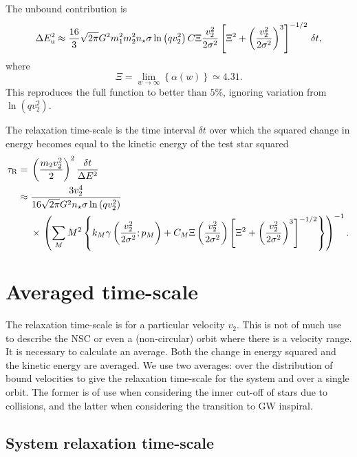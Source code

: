 The unbound contribution is
\begin{equation}
\Delta E_\mathrm{u}^2 \approx \dfrac{16}{3}\sqrt{2\pi}G^2m_1^2m_2^2n_\star\sigma\ln\left(qv_2^2\right) C \Xi \dfrac{v_2^2}{2\sigma^2} \left[\Xi^2 + \left(\dfrac{v_2^2}{2\sigma^2}\right)^3\right]^{-1/2}\,\delta t,
\label{eq:Unbound-approx}
\end{equation}
where
\begin{equation}
\Xi = \lim_{w \rightarrow \infty}\left\{\alpha(w)\right\} \simeq 4.31.
\end{equation}
This reproduces the full function to better than $5\%$, ignoring variation from $\ln\left(qv_2^2\right)$.

The relaxation time-scale is the time interval $\delta t$ over which the squared change in energy becomes equal to the kinetic energy of the test star squared \citep{Bar-Or2012}
\begin{align}
\tau_\mathrm{R} = {} & \left(\dfrac{m_2v_2^2}{2}\right)^2\dfrac{\delta t}{\Delta E^2} \\
 \approx {} & \dfrac{3v_2^4}{16\sqrt{2\pi}G^2n_\star\sigma\ln\left(qv_2^2\right)} \nonumber \\*
 {} & \times \left. \left(\sum_M M^2 \left\{k_M \gamma\left(\dfrac{v_2^2}{2\sigma^2};p_M\right) + C_M\Xi\left(\dfrac{v_2^2}{2\sigma^2}\right)\left[\Xi^2 + \left(\dfrac{v_2^2}{2\sigma^2}\right)^3\right]^{-1/2}\right\}\right)^{-1}. \right.
\label{eq:tau_R1}
\end{align}

\section{Averaged time-scale}

The relaxation time-scale  is for a particular velocity $v_2$. This is not of much use to describe the NSC or even a (non-circular) orbit where there is a velocity range. It is necessary to calculate an average. Both the change in energy squared and the kinetic energy are averaged. We use two averages: over the distribution of bound velocities to give the relaxation time-scale for the system and over a single orbit. The former is of use when considering the inner cut-off of stars due to collisions, and the latter when considering the transition to GW inspiral.

\subsection{System relaxation time-scale}\label{sec:system-ave}

